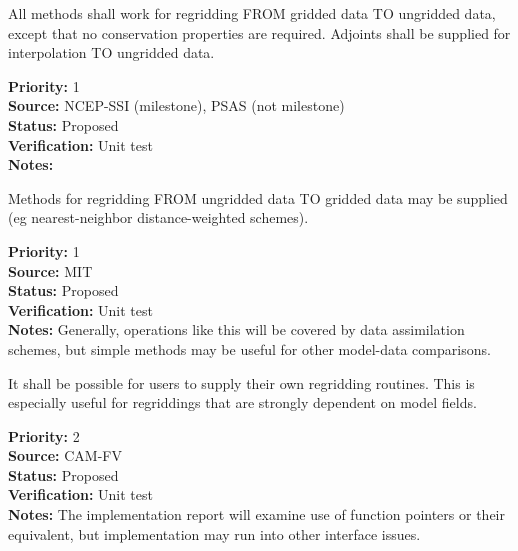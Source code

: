 
All methods shall work for regridding FROM gridded data TO ungridded
data, except that no conservation properties are required.
Adjoints shall be supplied for interpolation TO ungridded data.

\begin{reqlist}
{\bf Priority:} 1 \\
{\bf Source:}  NCEP-SSI (milestone), PSAS (not milestone)  \\
{\bf Status:} Proposed \\
{\bf Verification:} Unit test \\
{\bf Notes:} 
\end{reqlist}


Methods for regridding FROM ungridded data TO gridded data may be
supplied (eg nearest-neighbor distance-weighted schemes).

\begin{reqlist}
{\bf Priority:} 1 \\
{\bf Source:} MIT  \\
{\bf Status:} Proposed \\
{\bf Verification:} Unit test \\
{\bf Notes:} Generally, operations like this will be covered by
             data assimilation schemes, but simple methods may be useful
             for other model-data comparisons.
\end{reqlist}


It shall be possible for users to supply their own regridding
routines.  This is especially useful for regriddings that are
strongly dependent on model fields.

\begin{reqlist}
{\bf Priority:} 2 \\
{\bf Source:}  CAM-FV \\
{\bf Status:} Proposed \\
{\bf Verification:} Unit test \\
{\bf Notes:} The implementation report will examine use of
             function pointers or their equivalent, but implementation
             may run into other interface issues.

\end{reqlist}

